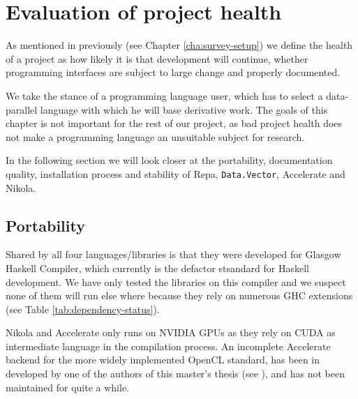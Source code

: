 \chapter{Evaluation of project health}
\label{chap:project-health}


As mentioned in previously (see Chapter
\ref{cha:survey-setup}) we define the health of a project as
how likely it is that development will continue, whether programming
interfaces are subject to large change and properly documented.


We take the stance of a programming language user, which has to select
a data-parallel language with which he will base derivative work. The
goals of this chapter is not important for the rest of our project, as
bad project health does not make a programming language an unsuitable
subject for research.

In the following section we will look closer at the portability,
documentation quality, installation process and stability of Repa,
\texttt{Data.Vector}, Accelerate and Nikola.

\section{Portability}
  


Shared by all four languages/libraries is that they were developed for
Glasgow Haskell Compiler, which currently is the defactor stsandard
for Haskell development. We have only tested the libraries on this
compiler and we suspect none of them will run else where because they
rely on numerous GHC extensions (see Table
\ref{tab:dependency-status}).

Nikola and Accelerate only runs on NVIDIA GPUs as they rely on CUDA as
intermediate language in the compilation process. An incomplete
Accelerate backend for the more widely implemented OpenCL standard,
has been in developed by one of the authors of this master's thesis
(see \cite{dybdal2011opencl}), and has not been maintained for quite
a while.

